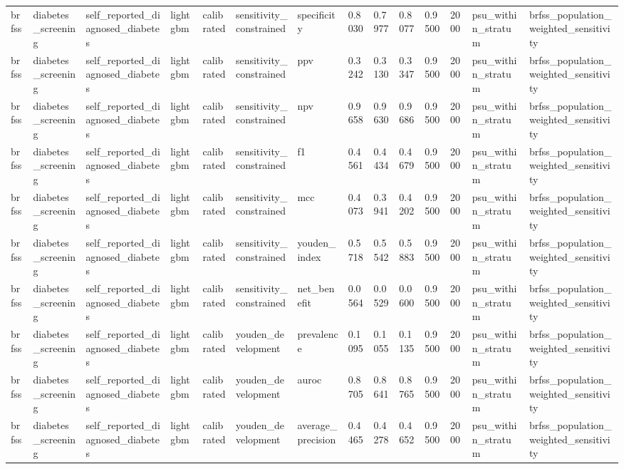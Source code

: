 \begin{tabular}{llllllllllllll}
brfss & diabetes\_screening & self\_reported\_diagnosed\_diabetes & lightgbm & calibrated & sensitivity\_constrained & specificity & 0.8030 & 0.7977 & 0.8077 & 0.9500 & 2000 & psu\_within\_stratum & brfss\_population\_weighted\_sensitivity \\
brfss & diabetes\_screening & self\_reported\_diagnosed\_diabetes & lightgbm & calibrated & sensitivity\_constrained & ppv & 0.3242 & 0.3130 & 0.3347 & 0.9500 & 2000 & psu\_within\_stratum & brfss\_population\_weighted\_sensitivity \\
brfss & diabetes\_screening & self\_reported\_diagnosed\_diabetes & lightgbm & calibrated & sensitivity\_constrained & npv & 0.9658 & 0.9630 & 0.9686 & 0.9500 & 2000 & psu\_within\_stratum & brfss\_population\_weighted\_sensitivity \\
brfss & diabetes\_screening & self\_reported\_diagnosed\_diabetes & lightgbm & calibrated & sensitivity\_constrained & f1 & 0.4561 & 0.4434 & 0.4679 & 0.9500 & 2000 & psu\_within\_stratum & brfss\_population\_weighted\_sensitivity \\
brfss & diabetes\_screening & self\_reported\_diagnosed\_diabetes & lightgbm & calibrated & sensitivity\_constrained & mcc & 0.4073 & 0.3941 & 0.4202 & 0.9500 & 2000 & psu\_within\_stratum & brfss\_population\_weighted\_sensitivity \\
brfss & diabetes\_screening & self\_reported\_diagnosed\_diabetes & lightgbm & calibrated & sensitivity\_constrained & youden\_index & 0.5718 & 0.5542 & 0.5883 & 0.9500 & 2000 & psu\_within\_stratum & brfss\_population\_weighted\_sensitivity \\
brfss & diabetes\_screening & self\_reported\_diagnosed\_diabetes & lightgbm & calibrated & sensitivity\_constrained & net\_benefit & 0.0564 & 0.0529 & 0.0600 & 0.9500 & 2000 & psu\_within\_stratum & brfss\_population\_weighted\_sensitivity \\
brfss & diabetes\_screening & self\_reported\_diagnosed\_diabetes & lightgbm & calibrated & youden\_development & prevalence & 0.1095 & 0.1055 & 0.1135 & 0.9500 & 2000 & psu\_within\_stratum & brfss\_population\_weighted\_sensitivity \\
brfss & diabetes\_screening & self\_reported\_diagnosed\_diabetes & lightgbm & calibrated & youden\_development & auroc & 0.8705 & 0.8641 & 0.8765 & 0.9500 & 2000 & psu\_within\_stratum & brfss\_population\_weighted\_sensitivity \\
brfss & diabetes\_screening & self\_reported\_diagnosed\_diabetes & lightgbm & calibrated & youden\_development & average\_precision & 0.4465 & 0.4278 & 0.4652 & 0.9500 & 2000 & psu\_within\_stratum & brfss\_population\_weighted\_sensitivity \\

\end{tabular}
